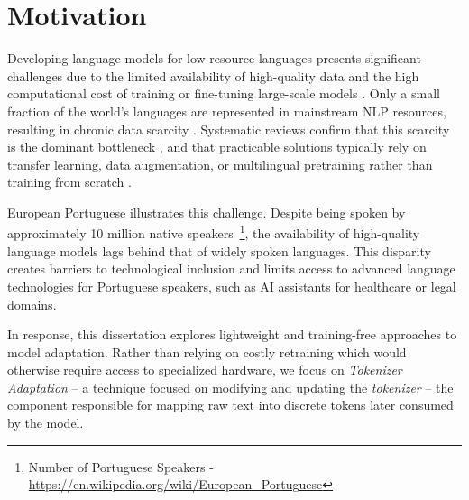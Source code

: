 \section{Motivation}\label{Section1.1}
Developing language models for low-resource languages presents significant challenges due to the limited availability of high-quality data and the high computational cost of training or fine-tuning large-scale models \cite{yassin2025state}.
Only a small fraction of the world's languages are represented in mainstream NLP resources, resulting in chronic data scarcity \cite{joshi2020state}.
Systematic reviews confirm that this scarcity is the dominant bottleneck \cite{mcgiff2025overcoming}, and that practicable solutions typically rely on transfer learning, data augmentation, or multilingual pretraining rather than training from scratch \cite{huang2024survey}.


European Portuguese illustrates this challenge. Despite being spoken by approximately 10 million native speakers~\footnote{Number of Portuguese Speakers - \href{https://en.wikipedia.org/wiki/European\_Portuguese}{https://en.wikipedia.org/wiki/European\_Portuguese}}, the availability of high-quality language models lags behind that of widely spoken languages. This disparity creates barriers to technological inclusion and limits access to advanced language technologies for Portuguese speakers, such as AI assistants for healthcare or legal domains.

In response, this dissertation explores lightweight and training-free approaches to model adaptation. Rather than relying on costly retraining which would otherwise require access to specialized hardware, we focus on \emph{Tokenizer Adaptation} -- a technique focused on modifying and updating the \emph{tokenizer} -- the component responsible for mapping raw text into discrete tokens later consumed by the model. 


